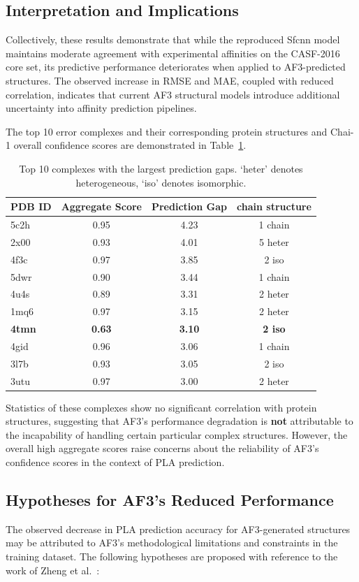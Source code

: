 \documentclass[unnumsec,webpdf,contemporary,large]{oup-authoring-template}
\theoremstyle{thmstyleone}%
\theoremstyle{thmstyletwo}%
\theoremstyle{thmstylethree}%
\begin{document}
\subsection{Interpretation and Implications}
Collectively, these results demonstrate that while the reproduced Sfcnn model 
maintains moderate agreement with experimental affinities on the CASF-2016 core set, 
its predictive performance deteriorates when applied to AF3-predicted structures. 
The observed increase in RMSE and MAE, coupled with reduced correlation, 
indicates that current AF3 structural models introduce additional uncertainty into affinity 
prediction pipelines.

The top 10 error complexes and their corresponding protein structures and Chai-1 overall confidence scores
are demonstrated in Table~\ref{tab:top10_error}.

\begin{table}[H]
\centering
\caption{Top 10 complexes with the largest prediction gaps.
`heter' denotes heterogeneous, `iso' denotes isomorphic.}
\label{tab:top10_error}
\begin{tabular}{lccc}
\toprule
PDB ID & Aggregate Score & Prediction Gap & chain structure\\
\midrule
5c2h & 0.95 & 4.23 & 1 chain\\
2x00 & 0.93 & 4.01 & 5 heter\\
4f3c & 0.97 & 3.85 & 2 iso\\
5dwr & 0.90 & 3.44 & 1 chain\\
4u4s & 0.89 & 3.31 & 2 heter\\
1mq6 & 0.97 & 3.15 & 2 heter\\
\textbf{4tmn} & \textbf{0.63} & \textbf{3.10} & \textbf{2 iso}\\
4gid & 0.96 & 3.06 & 1 chain\\
3l7b & 0.93 & 3.05 & 2 iso\\
3utu & 0.97 & 3.00 & 2 heter\\
\bottomrule
\end{tabular}
\end{table}


Statistics of these complexes show no significant correlation with protein structures,
suggesting that AF3's performance degradation is \textbf{not} attributable to the incapability of 
handling certain particular complex structures. However, the
overall high aggregate scores raise concerns about the reliability of
AF3's confidence scores in the context of PLA prediction. 

\subsection{Hypotheses for AF3's Reduced Performance}
The observed decrease in PLA prediction accuracy for 
AF3-generated structures may be attributed to AF3's methodological limitations and
constraints in the training dataset. The following hypotheses are proposed with
reference to the work of Zheng et al.~\cite{Zheng2025.04.07.647682}:
\end{document}
